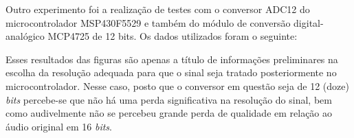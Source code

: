 		Outro experimento foi a realização de testes com o conversor ADC12 do microcontrolador MSP430F5529 e também do módulo de conversão digital-analógico MCP4725 de 12 bits. Os dados utilizados foram o seguinte:
		
		
		
		
		Esses resultados das figuras  são apenas a título de informações preliminares na escolha da resolução adequada para que o sinal seja tratado posteriormente no microcontrolador. Nesse caso, posto que o conversor em questão seja de 12 (doze) \textit{bits} percebe-se que não há uma perda significativa na resolução do sinal, bem como audivelmente não se percebeu grande perda de qualidade em relação ao áudio original em 16 \textit{bits}.
		
		\begin{figure}[!ht]
			\centering
			\qquad
		\end{figure}
	
